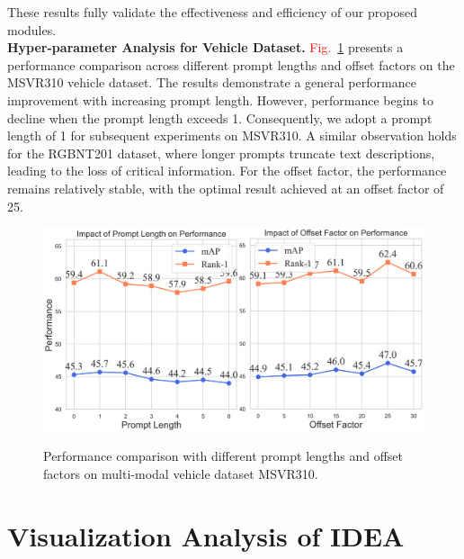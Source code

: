 %
These results fully validate the effectiveness and efficiency of our proposed modules.
\\
\textbf{Hyper-parameter Analysis for Vehicle Dataset.}
\textcolor{red}{Fig.}~\ref{fig:prompt_offset_msvr310} presents a performance comparison across different prompt lengths and offset factors on the MSVR310 vehicle dataset.
%
The results demonstrate a general performance improvement with increasing prompt length.
%
However, performance begins to decline when the prompt length exceeds 1.
%
Consequently, we adopt a prompt length of 1 for subsequent experiments on MSVR310.
%
A similar observation holds for the RGBNT201 dataset, where longer prompts truncate text descriptions, leading to the loss of critical information.
%
For the offset factor, the performance remains relatively stable, with the optimal result achieved at an offset factor of 25.
\begin{figure}[t]
  \centering
    \resizebox{0.475\textwidth}{!}
    {
  \includegraphics[width=30\linewidth]{sec/supp_img/Hyper_MSVR310.pdf}
  }
  \vspace{-3mm}
   \caption{Performance comparison with different prompt lengths and offset factors on multi-modal vehicle dataset MSVR310.}
  \label{fig:prompt_offset_msvr310}
  \vspace{-6mm}
\end{figure}
\section{Visualization Analysis of IDEA}
